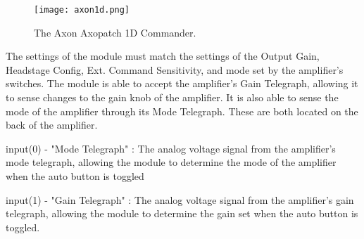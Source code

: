 \label{axon1dcommander}

\begin{figure}[h]
\begin{center}
\texttt{[image: axon1d.png]}
\caption[axon1d]{The Axon Axopatch 1D Commander.}
\end{center}
\end{figure}

The settings of the module must match the settings of the Output Gain, Headstage Config, Ext. Command Sensitivity, and mode set by the amplifier's switches. The module is able to accept the amplifier's Gain Telegraph, allowing it to sense changes to the gain knob of the amplifier. It is also able to sense the mode of the amplifier through its Mode Telegraph. These are both located on the back of the amplifier.

input(0) - "Mode Telegraph" : The analog voltage signal from the amplifier's mode telegraph, allowing the module to determine the mode of the amplifier when the auto button is toggled

input(1) - "Gain Telegraph" : The analog voltage signal from the amplifier's gain telegraph, allowing the module to determine the gain set when the auto button is toggled.